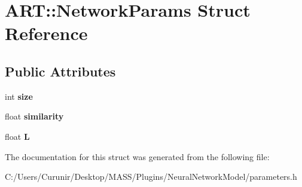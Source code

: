 \hypertarget{struct_a_r_t_1_1_network_params}{}\section{A\+RT\+:\+:Network\+Params Struct Reference}
\label{struct_a_r_t_1_1_network_params}
\subsection*{Public Attributes}
\begin{DoxyCompactItemize}
\item 
\mbox{\label{struct_a_r_t_1_1_network_params_aababa990b5d0e5d080003e52bc8347a2}} 
int {\bfseries size}
\item 
\mbox{\label{struct_a_r_t_1_1_network_params_ac985741814be043af5c083d3fb6cb44a}} 
float {\bfseries similarity}
\item 
\mbox{\label{struct_a_r_t_1_1_network_params_a2bd0fa378b49bddad207de236a7292d9}} 
float {\bfseries L}
\end{DoxyCompactItemize}


The documentation for this struct was generated from the following file\+:\begin{DoxyCompactItemize}
\item 
C\+:/\+Users/\+Curunir/\+Desktop/\+M\+A\+S\+S/\+Plugins/\+Neural\+Network\+Model/parameters.\+h\end{DoxyCompactItemize}
